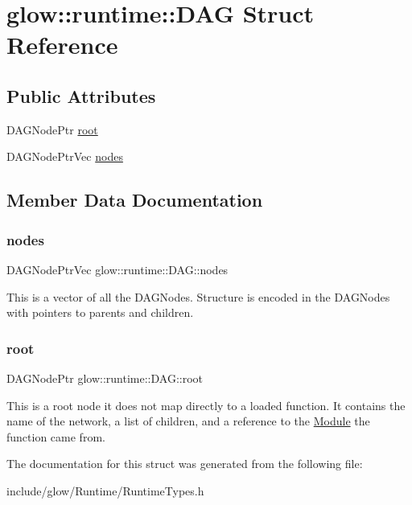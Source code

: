 \hypertarget{structglow_1_1runtime_1_1_d_a_g}{}\section{glow\+:\+:runtime\+:\+:D\+AG Struct Reference}
\label{structglow_1_1runtime_1_1_d_a_g}
\subsection*{Public Attributes}
\begin{DoxyCompactItemize}
\item 
D\+A\+G\+Node\+Ptr \hyperlink{structglow_1_1runtime_1_1_d_a_g_ab515727e5ecc953a9493ad6a5b1b3158}{root}
\item 
D\+A\+G\+Node\+Ptr\+Vec \hyperlink{structglow_1_1runtime_1_1_d_a_g_a0f6c315dd31c9202a564008e2ff0fb70}{nodes}
\end{DoxyCompactItemize}


\subsection{Member Data Documentation}
\mbox{\label{structglow_1_1runtime_1_1_d_a_g_a0f6c315dd31c9202a564008e2ff0fb70}} 
\subsubsection{\texorpdfstring{nodes}{nodes}}
{\footnotesize\ttfamily D\+A\+G\+Node\+Ptr\+Vec glow\+::runtime\+::\+D\+A\+G\+::nodes}

This is a vector of all the D\+A\+G\+Nodes. Structure is encoded in the D\+A\+G\+Nodes with pointers to parents and children. \mbox{\label{structglow_1_1runtime_1_1_d_a_g_ab515727e5ecc953a9493ad6a5b1b3158}} 
\subsubsection{\texorpdfstring{root}{root}}
{\footnotesize\ttfamily D\+A\+G\+Node\+Ptr glow\+::runtime\+::\+D\+A\+G\+::root}

This is a root node it does not map directly to a loaded function. It contains the name of the network, a list of children, and a reference to the \hyperlink{classglow_1_1_module}{Module} the function came from. 

The documentation for this struct was generated from the following file\+:\begin{DoxyCompactItemize}
\item 
include/glow/\+Runtime/Runtime\+Types.\+h\end{DoxyCompactItemize}
